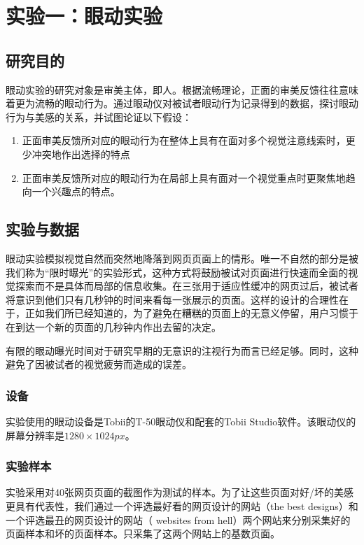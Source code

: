 \chapter{实验一：眼动实验}
\label{exp1}

\section{研究目的}
眼动实验的研究对象是审美主体，即人。根据流畅理论，正面的审美反馈往往意味着更为流畅的眼动行为。通过眼动仪对被试者眼动行为记录得到的数据，探讨眼动行为与美感的关系，并试图论证以下假设：

\begin{enumerate}
  \item 正面审美反馈所对应的眼动行为在整体上具有在面对多个视觉注意线索时，更少冲突地作出选择的特点
  \item 正面审美反馈所对应的眼动行为在局部上具有面对一个视觉重点时更聚焦地趋向一个兴趣点的特点。
\end{enumerate}

\section{实验与数据}
眼动实验模拟视觉自然而突然地降落到网页页面上的情形。唯一不自然的部分是被我们称为“限时曝光”的实验形式，这种方式将鼓励被试对页面进行快速而全面的视觉探索而不是具体而局部的信息收集。在三张用于适应性缓冲的网页过后，被试者将意识到他们只有几秒钟的时间来看每一张展示的页面。这样的设计的合理性在于，正如我们所已经知道的，为了避免在糟糕的页面上的无意义停留，用户习惯于在到达一个新的页面的几秒钟内作出去留的决定\cite{Liu2010}。

有限的眼动曝光时间对于研究早期的无意识的注视行为而言已经足够。同时，这种避免了因被试者的视觉疲劳而造成的误差。

\subsection{设备}
实验使用的眼动设备是Tobii的T-50眼动仪和配套的Tobii Studio软件。该眼动仪的屏幕分辨率是$1280\times1024px$。

\subsection{实验样本}
实验采用对40张网页页面的截图作为测试的样本。为了让这些页面对好/坏的美感更具有代表性，我们通过一个评选最好看的网页设计的网站（the best designs\footnotemark[1]）和一个评选最丑的网页设计的网站（ websites from hell\footnotemark[2]）两个网站来分别采集好的页面样本和坏的页面样本。只采集了这两个网站上的基数页面。

